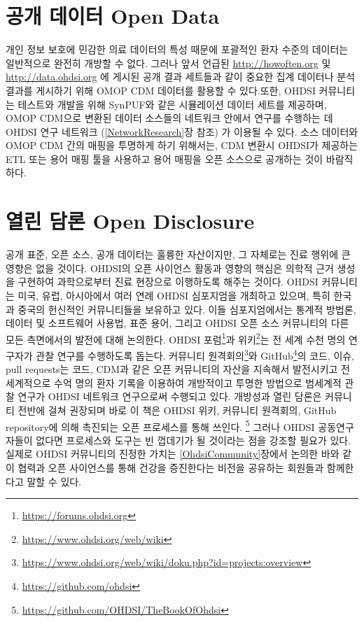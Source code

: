 \documentclass[10.5pt]{book}
\let\rmarkdownfootnote\footnote%
\def\footnote{\protect\rmarkdownfootnote}
\theoremstyle{definition}
\theoremstyle{definition}
\theoremstyle{definition}
\theoremstyle{remark}
\begin{document}
\section{공개 데이터 Open Data}\label{--open-data}


개인 정보 보호에 민감한 의료 데이터의 특성 때문에 포괄적인 환자 수준의
데이터는 일반적으로 완전히 개방할 수 없다. 그러나 앞서 언급된
\url{http://howoften.org} 및 \url{http://data.ohdsi.org} 에 게시된 공개
결과 세트들과 같이 중요한 집계 데이터나 분석 결과를 게시하기 위해 OMOP
CDM 데이터를 활용할 수 있다.또한, OHDSI 커뮤니티는 테스트와 개발을 위해
SynPUF와 같은 시뮬레이션 데이터 세트를 제공하며, OMOP CDM으로 변환된
데이터 소스들의 네트워크 안에서 연구를 수행하는 데 OHDSI 연구 네트워크
(\ref{NetworkResearch}장 참조) 가 이용될 수 있다. 소스 데이터와 OMOP CDM
간의 매핑을 투명하게 하기 위해서는, CDM 변환시 OHDSI가 제공하는 ETL 또는
용어 매핑 툴을 사용하고 용어 매핑을 오픈 소스으로 공개하는 것이
바람직하다.

\section{열린 담론 Open Disclosure}\label{--open-disclosure}


공개 표준, 오픈 소스, 공개 데이터는 훌륭한 자산이지만, 그 자체로는 진료
행위에 큰 영향은 없을 것이다. OHDSI의 오픈 사이언스 활동과 영향의 핵심은
의학적 근거 생성을 구현하여 과학으로부터 진료 현장으로 이행하도록 해주는
것이다. OHDSI 커뮤니티는 미국, 유럽, 아시아에서 여러 연례 OHDSI
심포지엄을 개최하고 있으며, 특히 한국과 중국의 헌신적인 커뮤니티들을
보유하고 있다. 이들 심포지엄에서는 통계적 방법론, 데이터 및 소프트웨어
사용법, 표준 용어, 그리고 OHDSI 오픈 소스 커뮤니티의 다른 모든
측면에서의 발전에 대해 논의한다. OHDSI 포럼\footnote{\url{https://forums.ohdsi.org}}과
위키\footnote{\url{https://www.ohdsi.org/web/wiki}}는 전 세계 수천 명의
연구자가 관찰 연구를 수행하도록 돕는다. 커뮤니티 원격회의\footnote{\url{https://www.ohdsi.org/web/wiki/doku.php?id=projects:overview}}와
GitHub\footnote{\url{https://github.com/ohdsi}}의 코드, 이슈, pull
requests는 코드, CDM과 같은 오픈 커뮤니티의 자산을 지속해서 발전시키고
전 세계적으로 수억 명의 환자 기록을 이용하여 개방적이고 투명한 방법으로
범세계적 관찰 연구가 OHDSI 네트워크 연구으로써 수행되고 있다. 개방성과
열린 담론은 커뮤니티 전반에 걸쳐 권장되며 바로 이 책은 OHDSI 위키,
커뮤니티 원격회의, GitHub repository에 의해 촉진되는 오픈 프로세스를
통해 쓰인다. \footnote{\url{https://github.com/OHDSI/TheBookOfOhdsi}}
그러나 OHDSI 공동연구자들이 없다면 프로세스와 도구는 빈 껍데기가 될
것이라는 점을 강조할 필요가 있다. 실제로 OHDSI 커뮤니티의 진정한 가치는
\ref{OhdsiCommunity}장에서 논의한 바와 같이 협력과 오픈 사이언스를 통해
건강을 증진한다는 비전을 공유하는 회원들과 함께한다고 말할 수 있다.
\end{document}
